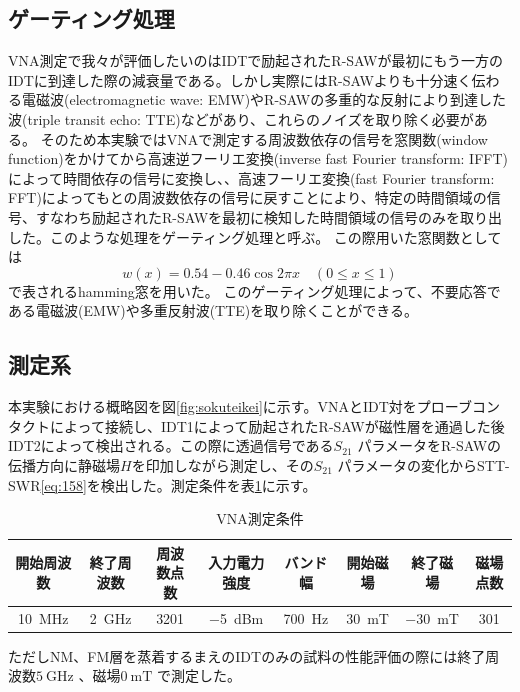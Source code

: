 \documentclass[dvipdfmx,11pt]{jsreport}
\numberwithin{equation}{chapter}
\numberwithin{table}{chapter}
\begin{document}
\subsection{ゲーティング処理}
VNA測定で我々が評価したいのはIDTで励起されたR-SAWが最初にもう一方のIDTに到達した際の減衰量である。しかし実際にはR-SAWよりも十分速く伝わる電磁波(electromagnetic wave: EMW)やR-SAWの多重的な反射により到達した波(triple transit echo: TTE)などがあり、これらのノイズを取り除く必要がある。
そのため本実験ではVNAで測定する周波数依存の信号を窓関数(window function)をかけてから高速逆フーリエ変換(inverse fast Fourier transform: IFFT)によって時間依存の信号に変換し、、高速フーリエ変換(fast Fourier transform: FFT)によってもとの周波数依存の信号に戻すことにより、特定の時間領域の信号、すなわち励起されたR-SAWを最初に検知した時間領域の信号のみを取り出した。このような処理をゲーティング処理と呼ぶ。
この際用いた窓関数としては
\begin{equation}
\label{eq:z6}
	w(x)=0.54-0.46 \cos 2\pi x\quad(0\le x\le 1)
\end{equation}
で表されるhamming窓を用いた。
このゲーティング処理によって、不要応答である電磁波(EMW)や多重反射波(TTE)を取り除くことができる。
\subsection{測定系}
本実験における概略図を図\ref{fig:sokuteikei}に示す。VNAとIDT対をプローブコンタクトによって接続し、IDT1によって励起されたR-SAWが磁性層を通過した後IDT2によって検出される。この際に透過信号である$S_{21}$ パラメータをR-SAWの伝播方向に静磁場$H$を印加しながら測定し、その$S_{21}$ パラメータの変化からSTT-SWR\eqref{eq:158}を検出した。測定条件を表\ref{tab:3}に示す。
\begin{table}[H]
	\centering
	\caption{VNA測定条件}
	\label{tab:3}
	\begin{tabular}{ccccc|ccc}\hline \hline
		開始周波数&終了周波数&周波数点数&入力電力強度&バンド幅&開始磁場&終了磁場&磁場点数\\ \hline 
		\SI{10}{\mega \hertz}&\SI{2}{\giga \hertz}&3201&\SI{-5}{dBm}&\SI{700}{\hertz}&\SI{30}{\milli \tesla}&\SI{-30}{\milli \tesla}&301\\\hline\hline
	\end{tabular}
\end{table}
ただしNM、FM層を蒸着するまえのIDTのみの試料の性能評価の際には終了周波数$\SI{5}{\giga \hertz}$ 、磁場$\SI{0}{\milli \tesla}$ で測定した。
\end{document}
